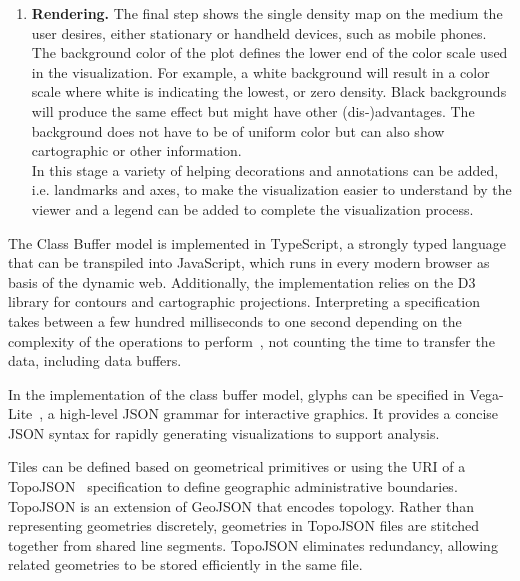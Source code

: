 \begin{enumerate}[leftmargin=*]
	\item \textbf{Rendering.} The final step shows the single density map on the medium the user desires, either stationary or handheld devices, such as mobile phones. The background color of the plot defines the lower end of the color scale used in the visualization. For example, a white background will result in a color scale where white is indicating the lowest, or zero density. Black backgrounds will produce the same effect but might have other (dis-)advantages. The background does not have to be of uniform color but can also show cartographic or other information.\\In this stage a variety of helping decorations and annotations can be added, i.e. landmarks and axes, to make the visualization easier to understand by the viewer and a legend can be added to complete the visualization process.
\end{enumerate}


The Class Buffer model is implemented in TypeScript, a strongly typed language that can be transpiled into JavaScript, which runs in every modern browser as basis of the dynamic web.
Additionally, the implementation relies on the D3 library for contours and cartographic projections.
Interpreting a specification takes between a few hundred milliseconds to one second depending on the complexity of the operations to perform~\cite{jo2019declarative}, not counting the time to transfer the data, including data buffers. 

In the implementation of the class buffer model, glyphs can be specified in Vega-Lite~\cite{satyanarayan2016vega}, a high-level JSON grammar for interactive graphics. It provides a concise JSON syntax for rapidly generating visualizations to support analysis.

Tiles can be defined based on geometrical primitives or using the URI of a TopoJSON~\cite{online:topojson} specification to define geographic administrative boundaries. TopoJSON is an extension of GeoJSON that encodes topology. Rather than representing geometries discretely, geometries in TopoJSON files are stitched together from shared line segments. TopoJSON eliminates redundancy, allowing related geometries to be stored efficiently in the same file.

